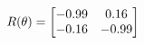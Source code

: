 \documentclass[preview]{standalone}
\begin{document}
\begin{align*}
\special{dvisvgm:raw <g id='unique000'>}R(\theta) = \begin{bmatrix}-0.99 & 0.16\\-0.16 & -0.99\end{bmatrix}\special{dvisvgm:raw </g>}
\end{align*}
\end{document}
